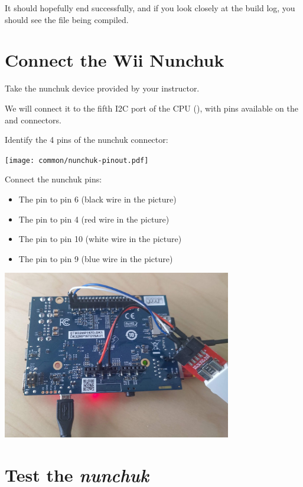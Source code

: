 It should hopefully end successfully, and if you look closely at the
build log, you should see the file  being compiled.

\section{Connect the Wii Nunchuk}

Take the nunchuk device provided by your instructor.

We will connect it to the fifth I2C port of the CPU (),
with pins available on the  and  connectors.

Identify the 4 pins of the nunchuk connector:

\begin{center}
\texttt{[image: common/nunchuk-pinout.pdf]}
\end{center}

Connect the nunchuk pins:
\begin{itemize}
\item The  pin to  pin 6 (black wire in the
  picture)
\item The  pin to  pin 4 (red wire in the
  picture)
\item The  pin to  pin 10 (white wire in the
  picture)
\item The  pin to  pin 9 (blue wire in the
  picture)
\end{itemize}

\begin{center}
\includegraphics[width=10cm]{labs/buildroot-rootfs-stm32/stm32mp1-nunchuk.jpg}
\end{center}

\section{Test the {\em nunchuk}}

